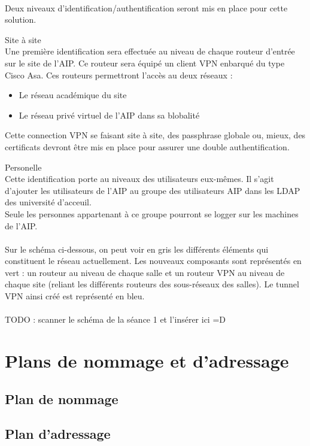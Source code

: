 \documentclass[a4paper]{article}
\begin{document}
	\paragraph*{} %
		Deux niveaux d'identification/authentification seront mis en place pour cette solution.
		\begin{description}
		\item{Site à site} \\
		Une première identification sera effectuée au niveau de chaque routeur d'entrée sur le site de l'AIP. Ce routeur sera équipé un client VPN enbarqué du type Cisco Asa. Ces routeurs permettront l'accès au deux réseaux : 
		\begin{itemize}
		\item Le réseau académique du site
		\item Le réseau privé virtuel de l'AIP dans sa blobalité
		\end{itemize}
		Cette connection VPN se faisant site à site, des passphrase globale ou, mieux, des certificats devront être mis en place pour assurer une double authentification.
		\item{Personelle} \\
		Cette identification porte au niveaux des utilisateurs eux-mêmes. Il s'agit d'ajouter les utilisateurs de l'AIP au groupe des utilisateurs AIP dans les LDAP des université d'acceuil.\\
		Seule les personnes appartenant à ce groupe pourront se logger sur les machines de l'AIP.
		\end{description}	
	
	\paragraph*{} %
	Sur le schéma ci-dessous, on peut voir en gris les différents éléments qui constituent le réseau actuellement. Les nouveaux composants sont représentés en vert : un routeur au niveau de chaque salle et un routeur VPN au niveau de chaque site (reliant les différents routeurs des sous-réseaux des salles). Le tunnel VPN ainsi créé est représenté en bleu. 
	
	\paragraph*{} %
	TODO : scanner le schéma de la séance 1 et l'insérer ici =D 

	
\section{Plans de nommage et d'adressage}
	\subsection{Plan de nommage}
	\subsection{Plan d'adressage}

	
\end{document}

